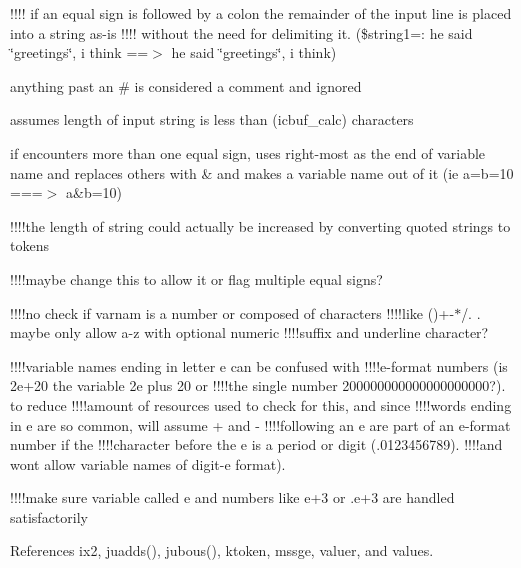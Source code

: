 !!!! if an equal sign is followed by a colon the remainder of the input line is placed into a string as-\/is !!!! without the need for delimiting it. (\$string1=\+: he said \char`\"{}greetings\char`\"{}, i think ==$>$ he said \char`\"{}greetings\char`\"{}, i think)

anything past an \# is considered a comment and ignored

assumes length of input string is less than (icbuf\+\_\+calc) characters

if encounters more than one equal sign, uses right-\/most as the end of variable name and replaces others with \& and makes a variable name out of it (ie a=b=10 ===$>$ a\&b=10)

!!!!the length of string could actually be increased by converting quoted strings to tokens

!!!!maybe change this to allow it or flag multiple equal signs?

!!!!no check if varnam is a number or composed of characters !!!!like ()+-\/$\ast$/. . maybe only allow a-\/z with optional numeric !!!!suffix and underline character?

!!!!variable names ending in letter e can be confused with !!!!e-\/format numbers (is 2e+20 the variable 2e plus 20 or !!!!the single number 200000000000000000000?). to reduce !!!!amount of resources used to check for this, and since !!!!words ending in e are so common, will assume + and -\/ !!!!following an e are part of an e-\/format number if the !!!!character before the e is a period or digit (.0123456789). !!!!and won\textquotesingle{}t allow variable names of digit-\/e format).

!!!!make sure variable called e and numbers like e+3 or .e+3 are handled satisfactorily 

References ix2, juadds(), jubous(), ktoken, mssge, valuer, and values.

